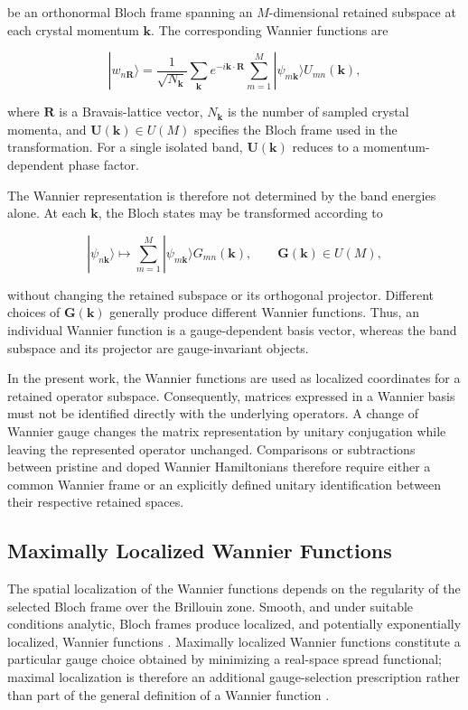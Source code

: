 be an orthonormal Bloch frame spanning an $M$-dimensional retained subspace at each crystal momentum $\mathbf{k}$. The corresponding Wannier functions are

\begin{equation}
  |w_{n\mathbf R}\rangle
  =
  \frac{1}{\sqrt{N_{\mathbf k}}}
  \sum_{\mathbf k}
    e^{-i\mathbf k\cdot\mathbf R}
    \sum_{m=1}^{M}
      |\psi_{m\mathbf k}\rangle
      U_{mn}(\mathbf k),
\end{equation}

where $\mathbf{R}$ is a Bravais-lattice vector, $N_{\mathbf{k}}$ is the number of sampled crystal momenta, and $\mathbf{U}(\mathbf k)\in U(M)$ specifies the Bloch frame used in the transformation. For a single isolated band, $\mathbf{U}(\mathbf k)$ reduces to a momentum-dependent phase factor.

The Wannier representation is therefore not determined by the band energies alone. At each $\mathbf k$, the Bloch states may be transformed according to

\begin{equation}
  |\psi_{n\mathbf k}\rangle
  \longmapsto
  \sum_{m=1}^{M}
    |\psi_{m\mathbf k}\rangle
    G_{mn}(\mathbf k),
  \qquad
  \mathbf G(\mathbf k)\in U(M),
\end{equation}

without changing the retained subspace or its orthogonal projector. Different choices of $\mathbf{G}(\mathbf{k})$ generally produce different Wannier functions. Thus, an individual Wannier function is a gauge-dependent basis vector, whereas the band subspace and its projector are gauge-invariant objects.



In the present work, the Wannier functions are used as localized coordinates for a retained operator subspace. Consequently, matrices expressed in a Wannier basis must not be identified directly with the underlying operators. A change of Wannier gauge changes the matrix representation by unitary conjugation while leaving the represented operator unchanged. Comparisons or subtractions between pristine and doped Wannier Hamiltonians therefore require either a common Wannier frame or an explicitly defined unitary identification between their respective retained spaces.

\subsection{Maximally Localized Wannier Functions}
The spatial localization of the Wannier functions depends on the regularity of the selected Bloch frame over the Brillouin zone. Smooth, and under suitable conditions analytic, Bloch frames produce localized, and potentially exponentially localized, Wannier functions \cite{kohn1959}. Maximally localized Wannier functions constitute a particular gauge choice obtained by minimizing a real-space spread functional; maximal localization is therefore an additional gauge-selection prescription rather than part of the general definition of a Wannier function \cite{marzari2012}.